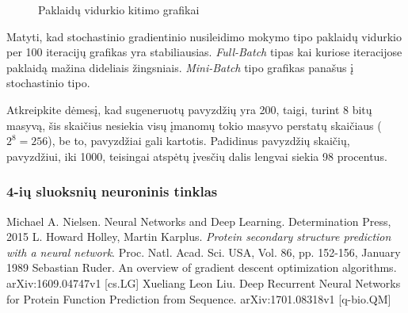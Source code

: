 \documentclass[a4paper,12pt]{article}
\begin{document}
\begin{figure}[h]
\centering
{}
\centering
{}
\centering
{}
\caption{Paklaidų vidurkio kitimo grafikai}
\end{figure}

Matyti, kad stochastinio gradientinio nusileidimo mokymo tipo paklaidų vidurkio per 100 iteracijų grafikas yra stabiliausias. \textit{Full-Batch} tipas kai kuriose iteracijose paklaidą mažina dideliais žingsniais. \textit{Mini-Batch} tipo grafikas panašus į stochastinio tipo.  

Atkreipkite dėmesį, kad sugeneruotų pavyzdžių yra 200, taigi, turint 8 bitų masyvą, šis skaičius nesiekia visų įmanomų tokio masyvo perstatų skaičiaus ($2^{8} = 256$), be to, pavyzdžiai gali kartotis. Padidinus pavyzdžių skaičių, pavyzdžiui, iki 1000, teisingai atspėtų įvesčių dalis lengvai siekia 98 procentus.

\subsubsection{4-ių sluoksnių neuroninis tinklas}

\medskip
\newpage
\begin{thebibliography}{9}
Michael A. Nielsen.
Neural Networks and Deep Learning.
Determination Press, 2015
L. Howard Holley, Martin Karplus.
\textit{Protein secondary structure prediction with a neural network}.
Proc. Natl. Acad. Sci. USA, Vol. 86, pp. 152-156, January 1989 
Sebastian Ruder.
An overview of gradient descent optimization algorithms.
arXiv:1609.04747v1 [cs.LG]
Xueliang Leon Liu.
Deep Recurrent Neural Networks for Protein Function Prediction from Sequence.
arXiv:1701.08318v1 [q-bio.QM]
\end{thebibliography}
\end{document}
